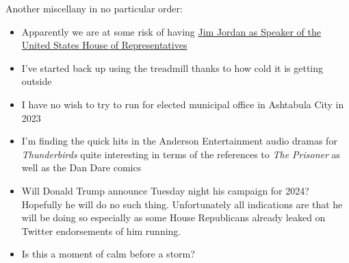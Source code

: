 Another miscellany in no particular order:

\begin{itemize}
\tightlist
\item
  Apparently we are at some risk of having
  \href{https://www.politico.com/news/2022/11/14/house-gop-leadership-elections-2022-elections-00066664}{Jim
  Jordan as Speaker of the United States House of Representatives}
\item
  I've started back up using the treadmill thanks to how cold it is
  getting outside
\item
  I have no wish to try to run for elected municipal office in Ashtabula
  City in 2023
\item
  I'm finding the quick hits in the Anderson Entertainment audio dramas
  for \emph{Thunderbirds} quite interesting in terms of the references
  to \emph{The Prisoner} as well as the Dan Dare comics
\item
  Will Donald Trump announce Tuesday night his campaign for 2024?
  Hopefully he will do no such thing. Unfortunately all indications are
  that he will be doing so especially as some House Republicans already
  leaked on Twitter endorsements of him running.
\item
  Is this a moment of calm before a storm?
\end{itemize}
